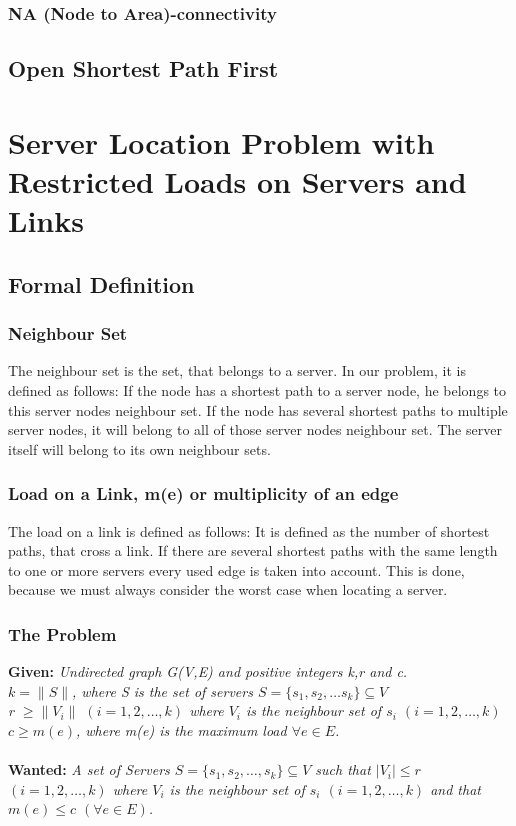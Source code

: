 \documentclass [12pt]{article}
\begin{document}
\subsubsection {NA (Node to Area)-connectivity}
\subsection{Open Shortest Path First}
\section{Server Location Problem with Restricted Loads on Servers and Links}
\subsection{Formal Definition}
\subsubsection{Neighbour Set}
The neighbour set is the set, that belongs to a server. In our problem, it is
defined as follows: If the node has a shortest path to a server node, he 
belongs to this server nodes neighbour set. If the node has several shortest
paths to multiple server nodes, it will belong to all of those server nodes neighbour
set. The server itself will belong to its own neighbour sets.
\subsubsection{Load on a Link, m(e) or multiplicity of an edge}
The load on a link is defined as follows: 
It is defined as the number of shortest paths, that cross a link. If there
are several shortest paths with the same length to one or more servers every
used edge is taken into account. This is done, because we must always consider
the worst case when locating a server.
\subsubsection{The Problem}
\textbf{Given:}
{\itshape Undirected graph G(V,E) and  positive integers k,r and c. \\
    $k = \|S\|$, where S is the set of servers $S = \{s_1,s_2,\dots s_k\} \subseteq V$\\
    r $\geq  \|V_i\|$ $(i=1,2,\dots,k)$ where $V_i$ is the neighbour set of $s_i$ $(i=1,2,\dots,k)$\\
$c \geq m(e)$, where m(e) is the maximum load $\forall e \in E$.} \\
\\
\textbf{Wanted:} 
{\itshape A set of Servers $S = \{s_1, s_2,\dots, s_k \} \subseteq V$ such that $|V_i|\leq r$
    $(i = 1,2, \dots,k)$ where $V_i$ is the neighbour set of $s_i$  $(i = 1,2,\dots,k)$ and that
$m(e) \leq c$ $(\forall e \in E)$.}
\end{document}
